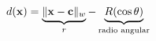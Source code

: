 \documentclass[preview]{standalone}
\begin{document}
\begin{align*}
\special{dvisvgm:raw <g id='unique000'>}d(\mathbf{x}) = \underbrace{\|\mathbf{x} - \mathbf{c}\|_w}_{r} - \underbrace{R(\cos\theta)}_{\text{radio angular}}\special{dvisvgm:raw </g>}
\end{align*}
\end{document}
